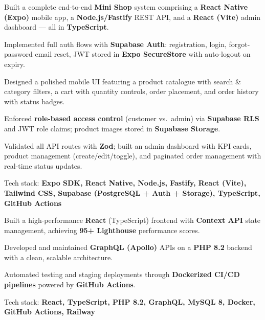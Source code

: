 \documentclass[]{deedy-resume-reversed}
\begin{document}
\vspace{2pt}
\begin{tightemize}
\item Built a complete end-to-end \textbf{Mini Shop} system comprising a \textbf{React Native (Expo)} mobile app, a \textbf{Node.js/Fastify} REST API, and a \textbf{React (Vite)} admin dashboard --- all in \textbf{TypeScript}.
\item Implemented full auth flows with \textbf{Supabase Auth}: registration, login, forgot-password email reset, JWT stored in \textbf{Expo SecureStore} with auto-logout on expiry.
\item Designed a polished mobile UI featuring a product catalogue with search \& category filters, a cart with quantity controls, order placement, and order history with status badges.
\item Enforced \textbf{role-based access control} (customer vs.\ admin) via \textbf{Supabase RLS} and JWT role claims; product images stored in \textbf{Supabase Storage}.
\item Validated all API routes with \textbf{Zod}; built an admin dashboard with KPI cards, product management (create/edit/toggle), and paginated order management with real-time status updates.
\item Tech stack: \textbf{Expo SDK, React Native, Node.js, Fastify, React (Vite), Tailwind CSS, Supabase (PostgreSQL + Auth + Storage), TypeScript, GitHub Actions}
\end{tightemize}
\vspace{6pt}

\vspace{2pt}
\begin{tightemize}
\item Built a high-performance \textbf{React} (TypeScript) frontend with \textbf{Context API} state management, achieving \textbf{95+ Lighthouse} performance scores.
\item Developed and maintained \textbf{GraphQL (Apollo)} APIs on a \textbf{PHP 8.2} backend with a clean, scalable architecture.
\item Automated testing and staging deployments through \textbf{Dockerized CI/CD pipelines} powered by \textbf{GitHub Actions}.
\item Tech stack: \textbf{React, TypeScript, PHP 8.2, GraphQL, MySQL 8, Docker, GitHub Actions, Railway}
\end{tightemize}
\vspace{6pt}
\end{document}
